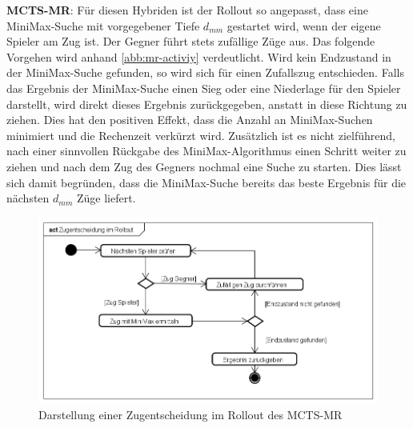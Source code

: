\documentclass[12pt,a4paper,bibliography=totocnumbered,listof=totocnumbered]{article}
\begin{document}
\textbf{MCTS-MR}: Für diesen Hybriden ist der Rollout so angepasst, dass eine MiniMax-Suche mit vorgegebener Tiefe $d_{mm}$ gestartet wird, wenn der eigene Spieler am Zug ist. Der Gegner führt stets zufällige Züge aus. Das folgende Vorgehen wird anhand \autoref{abb:mr-activiy} verdeutlicht. Wird kein Endzustand in der MiniMax-Suche gefunden, so wird sich für einen Zufallszug entschieden. Falls das Ergebnis der MiniMax-Suche einen Sieg oder eine Niederlage für den Spieler darstellt, wird direkt dieses Ergebnis zurückgegeben, anstatt in diese Richtung zu ziehen. Dies hat den positiven Effekt, dass die Anzahl an MiniMax-Suchen minimiert und die Rechenzeit verkürzt wird. Zusätzlich ist es nicht zielführend, nach einer sinnvollen Rückgabe des MiniMax-Algorithmus einen Schritt weiter zu ziehen und nach dem Zug des Gegners nochmal eine Suche zu starten. Dies lässt sich damit begründen, dass die MiniMax-Suche bereits das beste Ergebnis für die nächsten $d_{mm}$ Züge liefert.
\begin{figure}[h]
\centering
\includegraphics[scale=0.6]{pics/MR-activity.png}
\caption{Darstellung einer Zugentscheidung im Rollout des MCTS-MR}
\label{abb:mr-activiy}
\end{figure}
\end{document}
